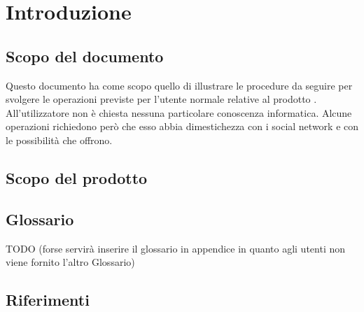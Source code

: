 %


\section{Introduzione} %
\label{sec:introduzione}


	\subsection{Scopo del documento} %
	\label{sub:scopo_del_documento}
		Questo documento ha come scopo quello di illustrare le procedure da seguire per svolgere le operazioni previste per l'utente normale relative al prodotto \projectName. All'utilizzatore non è chiesta nessuna particolare conoscenza informatica. Alcune operazioni richiedono però che esso abbia dimestichezza con i social network e con le possibilità che offrono.


	\subsection{Scopo del prodotto} %
	\label{sub:scopo_del_prodotto}
		\productScope


	\subsection{Glossario} %
	\label{sub:glossario}
		TODO (forse servirà inserire il glossario in appendice in quanto agli utenti non viene fornito l'altro Glossario) \newline
		\glossarioDesc


	\subsection{Riferimenti} %
	\label{sub:riferimenti}


